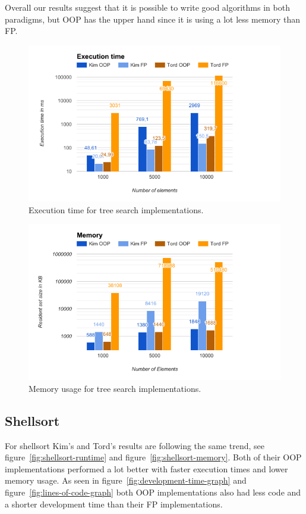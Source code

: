 \documentclass {article}
\begin{document}
Overall our results suggest that it is possible to write good algorithms in both paradigms, but OOP has the upper hand since it is using a lot less memory than FP.
\begin{figure}[H]
\includegraphics[width=\textwidth]{binary-tree-runtime}

\caption{Execution time for tree search implementations.}
\label{fig:binary-tree-runtime}
\end{figure}

\begin{figure}[H]
\includegraphics[width=\textwidth]{binary-tree-memory}

\caption{Memory usage for tree search implementations.}
\label{fig:binary-tree-memory}
\end{figure}
\subsection{Shellsort}
\label{sec:shellsort-results}
For shellsort Kim's and Tord's results are following the same trend, see figure~\ref{fig:shellsort-runtime} and figure~\ref{fig:shellsort-memory}. Both of their OOP implementations performed a lot better with faster execution times and lower memory usage. As seen in figure~\ref{fig:development-time-graph} and figure~\ref{fig:lines-of-code-graph} both OOP implementations also had less code and a shorter development time than their FP implementations.
\end{document}
